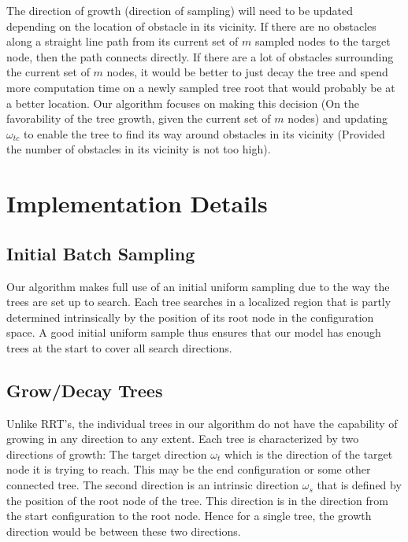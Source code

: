 \documentclass[fleqn]{article}
\begin{document}
	The direction of growth (direction of sampling) will need to be updated depending on the location of obstacle in its vicinity. If there are no obstacles along a straight line path from its current set of $m$ sampled nodes to the target node, then the path connects directly. If there are a lot of obstacles surrounding the current set of $m$ nodes, it would be better to just decay the tree and spend more computation time on a newly sampled tree root that would probably be at a better location. Our algorithm focuses on making this decision (On the favorability of the tree growth, given the current set of $m$ nodes) and updating $\omega_{tc}$ to enable the tree to find its way around obstacles in its vicinity (Provided the number of obstacles in its vicinity is not too high).
	
	
	
	
	
	
	\section*{Implementation Details}
	
	\subsection*{Initial Batch Sampling}
	
	Our algorithm makes full use of an initial uniform sampling due to the way the trees are set up to search. Each tree searches in a localized region that is partly determined intrinsically by the position of its root node in the configuration space. A good initial uniform sample thus ensures that our model has enough trees at the start to cover all search directions.
	
	\subsection*{Grow/Decay Trees}
	
	Unlike RRT's, the individual trees in our algorithm do not have the capability of growing in any direction to any extent. Each tree is characterized by two directions of growth: The target direction $\omega_t$ which is the direction of the target node it is trying to reach. This may be the end configuration or some other connected tree. The second direction is an intrinsic direction $\omega_s$ that is defined by the position of the root node of the tree. This direction is in the direction from the start configuration to the root node. Hence for a single tree,  the growth direction would be between these two directions.
	
\end{document}
